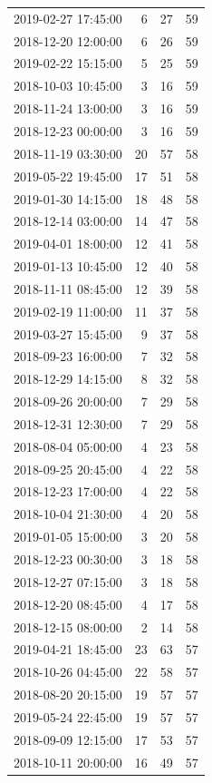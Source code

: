 \begin{tabular}{lrrr}
2019-02-27 17:45:00 & 6 & 27 & 59 \\
2018-12-20 12:00:00 & 6 & 26 & 59 \\
2019-02-22 15:15:00 & 5 & 25 & 59 \\
2018-10-03 10:45:00 & 3 & 16 & 59 \\
2018-11-24 13:00:00 & 3 & 16 & 59 \\
2018-12-23 00:00:00 & 3 & 16 & 59 \\
2018-11-19 03:30:00 & 20 & 57 & 58 \\
2019-05-22 19:45:00 & 17 & 51 & 58 \\
2019-01-30 14:15:00 & 18 & 48 & 58 \\
2018-12-14 03:00:00 & 14 & 47 & 58 \\
2019-04-01 18:00:00 & 12 & 41 & 58 \\
2019-01-13 10:45:00 & 12 & 40 & 58 \\
2018-11-11 08:45:00 & 12 & 39 & 58 \\
2019-02-19 11:00:00 & 11 & 37 & 58 \\
2019-03-27 15:45:00 & 9 & 37 & 58 \\
2018-09-23 16:00:00 & 7 & 32 & 58 \\
2018-12-29 14:15:00 & 8 & 32 & 58 \\
2018-09-26 20:00:00 & 7 & 29 & 58 \\
2018-12-31 12:30:00 & 7 & 29 & 58 \\
2018-08-04 05:00:00 & 4 & 23 & 58 \\
2018-09-25 20:45:00 & 4 & 22 & 58 \\
2018-12-23 17:00:00 & 4 & 22 & 58 \\
2018-10-04 21:30:00 & 4 & 20 & 58 \\
2019-01-05 15:00:00 & 3 & 20 & 58 \\
2018-12-23 00:30:00 & 3 & 18 & 58 \\
2018-12-27 07:15:00 & 3 & 18 & 58 \\
2018-12-20 08:45:00 & 4 & 17 & 58 \\
2018-12-15 08:00:00 & 2 & 14 & 58 \\
2019-04-21 18:45:00 & 23 & 63 & 57 \\
2018-10-26 04:45:00 & 22 & 58 & 57 \\
2018-08-20 20:15:00 & 19 & 57 & 57 \\
2019-05-24 22:45:00 & 19 & 57 & 57 \\
2018-09-09 12:15:00 & 17 & 53 & 57 \\
2018-10-11 20:00:00 & 16 & 49 & 57 \\

\end{tabular}
